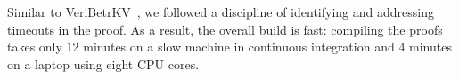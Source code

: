 

\begin{comment}
begin
    gsed -n '/method[^(]* [A-Z]*(/,/^\s*{/p' src/fs/dir_fs.dfy
    cat src/fs/nfs.s.dfy
end | wc -l
\end{comment}
%


Similar to VeriBetrKV~\cite{hance:veribetrkv}, we followed a
discipline of identifying and addressing timeouts in the proof.
As a result, the overall
build is fast: compiling the proofs takes only 12 minutes on a slow
machine in continuous integration and 4 minutes on a laptop
using eight CPU cores.



